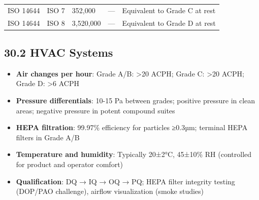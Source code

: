 \documentclass[
  11pt,
  a4paper,
]{report}
\providecommand{\tightlist}{%
  \setlength{\itemsep}{0pt}\setlength{\parskip}{0pt}}
\begin{document}
\begin{longtable}[]{@{}lllll@{}}
\begin{minipage}[t]{0.08\columnwidth}
ISO 14644\strut
\end{minipage} & \begin{minipage}[t]{0.06\columnwidth}\raggedright
ISO 7\strut
\end{minipage} & \begin{minipage}[t]{0.29\columnwidth}\raggedright
352,000\strut
\end{minipage} & \begin{minipage}[t]{0.33\columnwidth}\raggedright
---\strut
\end{minipage} & \begin{minipage}[t]{0.10\columnwidth}\raggedright
Equivalent to Grade C at rest\strut
\end{minipage}\tabularnewline
\begin{minipage}[t]{0.08\columnwidth}\raggedright
ISO 14644\strut
\end{minipage} & \begin{minipage}[t]{0.06\columnwidth}\raggedright
ISO 8\strut
\end{minipage} & \begin{minipage}[t]{0.29\columnwidth}\raggedright
3,520,000\strut
\end{minipage} & \begin{minipage}[t]{0.33\columnwidth}\raggedright
---\strut
\end{minipage} & \begin{minipage}[t]{0.10\columnwidth}\raggedright
Equivalent to Grade D at rest\strut
\end{minipage}\tabularnewline
\bottomrule
\end{longtable}

\hypertarget{hvac-systems}{%
\subsection{30.2 HVAC Systems}\label{hvac-systems}}

\begin{itemize}
\tightlist
\item
  \textbf{Air changes per hour}: Grade A/B: \textgreater20 ACPH; Grade
  C: \textgreater20 ACPH; Grade D: \textgreater6 ACPH
\item
  \textbf{Pressure differentials}: 10-15 Pa between grades; positive
  pressure in clean areas; negative pressure in potent compound suites
\item
  \textbf{HEPA filtration}: 99.97\% efficiency for particles ≥0.3µm;
  terminal HEPA filters in Grade A/B
\item
  \textbf{Temperature and humidity}: Typically 20±2°C, 45±10\% RH
  (controlled for product and operator comfort)
\item
  \textbf{Qualification}: DQ → IQ → OQ → PQ; HEPA filter integrity
  testing (DOP/PAO challenge), airflow visualization (smoke studies)
\end{itemize}
\end{document}
